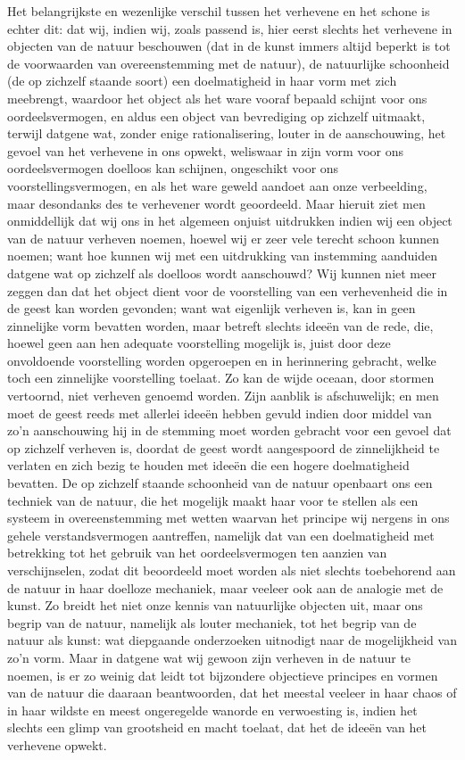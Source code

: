 Het belangrijkste en wezenlijke verschil tussen het verhevene en het schone is echter dit: dat wij, indien wij, zoals passend is, hier eerst slechts het verhevene in objecten van de natuur beschouwen (dat in de kunst immers altijd beperkt is tot de voorwaarden van overeenstemming met de natuur), de natuurlijke schoonheid (de op zichzelf staande soort) een doelmatigheid in haar vorm met zich meebrengt, waardoor het object als het ware vooraf bepaald schijnt voor ons oordeelsvermogen, en aldus een object van bevrediging op zichzelf uitmaakt, terwijl datgene wat, zonder enige rationalisering, louter in de aanschouwing, het gevoel van het verhevene in ons opwekt, weliswaar in zijn vorm voor ons oordeelsvermogen doelloos kan schijnen, ongeschikt voor ons voorstellingsvermogen, en als het ware geweld aandoet aan onze verbeelding, maar desondanks des te verhevener wordt geoordeeld.
Maar hieruit ziet men onmiddellijk dat wij ons in het algemeen onjuist uitdrukken indien wij een object van de natuur verheven noemen, hoewel wij er zeer vele terecht schoon kunnen noemen; want hoe kunnen wij met een uitdrukking van instemming aanduiden datgene wat op zichzelf als doelloos wordt aanschouwd?
Wij kunnen niet meer zeggen dan dat het object dient voor de voorstelling van een verhevenheid die in de geest kan worden gevonden; want wat eigenlijk verheven is, kan in geen zinnelijke vorm bevatten worden, maar betreft slechts ideeën van de rede, die, hoewel geen aan hen adequate voorstelling mogelijk is, juist door deze onvoldoende voorstelling worden opgeroepen en in herinnering gebracht, welke toch een zinnelijke voorstelling toelaat.
Zo kan de wijde oceaan, door stormen vertoornd, niet verheven genoemd worden. Zijn aanblik is afschuwelijk; en men moet de geest reeds met allerlei ideeën hebben gevuld indien door middel van zo’n aanschouwing hij in de stemming moet worden gebracht voor een gevoel dat op zichzelf verheven is, doordat de geest wordt aangespoord de zinnelijkheid te verlaten en zich bezig te houden met ideeën die een hogere doelmatigheid bevatten.
De op zichzelf staande schoonheid van de natuur openbaart ons een techniek van de natuur, die het mogelijk maakt haar voor te stellen als een systeem in overeenstemming met wetten waarvan het principe wij nergens in ons gehele verstandsvermogen aantreffen, namelijk dat van een doelmatigheid met betrekking tot het gebruik van het oordeelsvermogen ten aanzien van verschijnselen, zodat dit beoordeeld moet worden als niet slechts toebehorend aan de natuur in haar doelloze mechaniek, maar veeleer ook aan de analogie met de kunst.
Zo breidt het niet onze kennis van natuurlijke objecten uit, maar ons begrip van de natuur, namelijk als louter mechaniek, tot het begrip van de natuur als kunst: wat diepgaande onderzoeken uitnodigt naar de mogelijkheid van zo’n vorm.
Maar in datgene wat wij gewoon zijn verheven in de natuur te noemen, is er zo weinig dat leidt tot bijzondere objectieve principes en vormen van de natuur die daaraan beantwoorden, dat het meestal veeleer in haar chaos of in haar wildste en meest ongeregelde wanorde en verwoesting is, indien het slechts een glimp van grootsheid en macht toelaat, dat het de ideeën van het verhevene opwekt.

